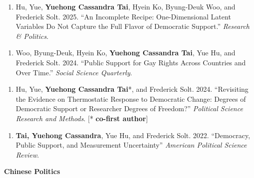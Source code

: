 \documentclass[10.5pt,]{article}
\providecommand{\tightlist}{%
	\setlength{\itemsep}{0pt}\setlength{\parskip}{0pt}}
\renewenvironment{itemize}{
	\begin{list}{}{
			\setlength{\leftmargin}{1.5em}
		}
	}{
	\end{list}
}
\begin{document}
\begin{itemize}
\begin{itemize}
  \item
    \begin{enumerate}
    \def\labelenumi{\arabic{enumi}.}
    \setcounter{enumi}{5}
    \tightlist
    \item
      Hu, Yue, \textbf{Yuehong Cassandra Tai}, Hyein Ko, Byung-Deuk Woo,
      and Frederick Solt. 2025. ``An Incomplete Recipe: One-Dimensional
      Latent Variables Do Not Capture the Full Flavor of Democratic
      Support.'' \emph{Research \& Politics}.
    \end{enumerate}
  \item
    \begin{enumerate}
    \def\labelenumi{\arabic{enumi}.}
    \setcounter{enumi}{4}
    \tightlist
    \item
      Woo, Byung-Deuk, Hyein Ko, \textbf{Yuehong Cassandra Tai}, Yue Hu,
      and Frederick Solt. 2024. ``Public Support for Gay Rights Across
      Countries and Over Time.'' \emph{Social Science Quarterly}.
    \end{enumerate}
  \item
    \begin{enumerate}
    \def\labelenumi{\arabic{enumi}.}
    \setcounter{enumi}{3}
    \tightlist
    \item
      Hu, Yue, \textbf{Yuehong Cassandra Tai}*, and Frederick Solt.
      2024. ``Revisiting the Evidence on Thermostatic Response to
      Democratic Change: Degrees of Democratic Support or Researcher
      Degrees of Freedom?'' \emph{Political Science Research and
      Methods}. {[}* \textbf{co-first author}{]}
    \end{enumerate}
  \item
    \begin{enumerate}
    \def\labelenumi{\arabic{enumi}.}
    \setcounter{enumi}{2}
    \tightlist
    \item
      \textbf{Tai, Yuehong Cassandra}, Yue Hu, and Frederick Solt. 2022.
      ``Democracy, Public Support, and Measurement Uncertainty''
      \emph{American Political Science Review}.
    \end{enumerate}
  \end{itemize}
\item
  \textbf{Chinese Politics}


\end{itemize}
\end{document}
